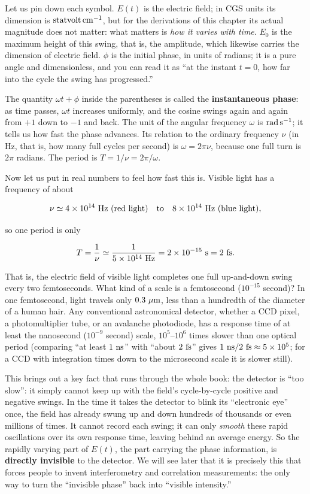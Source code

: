 Let us pin down each symbol. \(E(t)\) is the electric field; in CGS units its dimension is \({\rm statvolt\,cm^{-1}}\), but for the derivations of this chapter its actual magnitude does not matter: what matters is \emph{how it varies with time}. \(E_0\) is the maximum height of this swing, that is, the amplitude, which likewise carries the dimension of electric field. \(\phi\) is the initial phase, in units of radians; it is a pure angle and dimensionless, and you can read it as ``at the instant \(t=0\), how far into the cycle the swing has progressed.''

The quantity \(\omega t+\phi\) inside the parentheses is called the \textbf{instantaneous phase}: as time passes, \(\omega t\) increases uniformly, and the cosine swings again and again from \(+1\) down to \(-1\) and back. The unit of the angular frequency \(\omega\) is \({\rm rad\,s^{-1}}\); it tells us how fast the phase advances. Its relation to the ordinary frequency \(\nu\) (in Hz, that is, how many full cycles per second) is \(\omega=2\pi\nu\), because one full turn is \(2\pi\) radians. The period is \(T=1/\nu=2\pi/\omega\).

Now let us put in real numbers to feel how fast this is. Visible light has a frequency of about

\[
  \nu\simeq 4\times10^{14}\ {\rm Hz}\ (\text{red light})\quad\text{to}\quad 8\times10^{14}\ {\rm Hz}\ (\text{blue light}),
\]

so one period is only

\[
  T=\frac{1}{\nu}\simeq\frac{1}{5\times10^{14}\ {\rm Hz}}=2\times10^{-15}\ {\rm s}=2\ {\rm fs}.
\]

That is, the electric field of visible light completes one full up-and-down swing every two femtoseconds. What kind of a scale is a femtosecond (\(10^{-15}\) second)? In one femtosecond, light travels only \(0.3\ \mu{\rm m}\), less than a hundredth of the diameter of a human hair. Any conventional astronomical detector, whether a CCD pixel, a photomultiplier tube, or an avalanche photodiode, has a response time of at least the nanosecond (\(10^{-9}\) second) scale, \(10^{5}\)--\(10^{6}\) times slower than one optical period (comparing ``at least \(1\ {\rm ns}\)'' with ``about \(2\ {\rm fs}\)'' gives \(1\ {\rm ns}/2\ {\rm fs}\approx5\times10^{5}\); for a CCD with integration times down to the microsecond scale it is slower still).

This brings out a key fact that runs through the whole book: the detector is ``too slow'': it simply cannot keep up with the field's cycle-by-cycle positive and negative swings. In the time it takes the detector to blink its ``electronic eye'' once, the field has already swung up and down hundreds of thousands or even millions of times. It cannot record each swing; it can only \emph{smooth} these rapid oscillations over its own response time, leaving behind an average energy. So the rapidly varying part of \(E(t)\), the part carrying the phase information, is \textbf{directly invisible} to the detector. We will see later that it is precisely this that forces people to invent interferometry and correlation measurements: the only way to turn the ``invisible phase'' back into ``visible intensity.''

